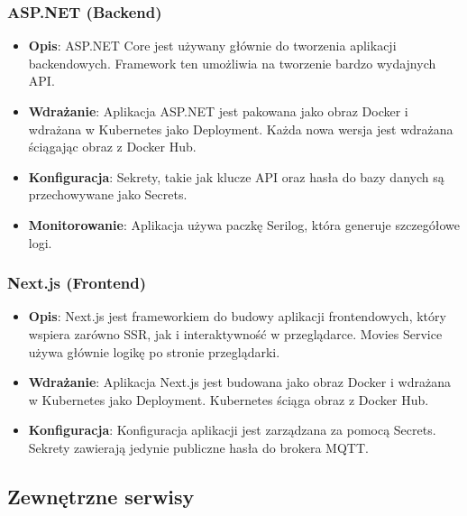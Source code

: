 \documentclass[12pt,a4paper]{article}
\begin{document}
\subsubsection{ASP.NET (Backend)}
\begin{itemize}
    \item \textbf{Opis}: ASP.NET Core jest używany głównie do tworzenia aplikacji backendowych. Framework ten umożliwia na tworzenie bardzo wydajnych API.
    \item \textbf{Wdrażanie}: Aplikacja ASP.NET jest pakowana jako obraz Docker i wdrażana w Kubernetes jako Deployment. Każda nowa wersja jest wdrażana ściągając obraz z Docker Hub.
    \item \textbf{Konfiguracja}: Sekrety, takie jak klucze API oraz hasła do bazy danych są przechowywane jako Secrets.
    \item \textbf{Monitorowanie}: Aplikacja używa paczkę Serilog, która generuje szczegółowe logi.
\end{itemize}

\newpage

\subsubsection{Next.js (Frontend)}
\begin{itemize}
    \item \textbf{Opis}: Next.js jest frameworkiem do budowy aplikacji frontendowych, który wspiera zarówno SSR, jak i interaktywność w przeglądarce. Movies Service używa głównie logikę po stronie przeglądarki.
    \item \textbf{Wdrażanie}: Aplikacja Next.js jest budowana jako obraz Docker i wdrażana w Kubernetes jako Deployment. Kubernetes ściąga obraz z Docker Hub.
    \item \textbf{Konfiguracja}: Konfiguracja aplikacji jest zarządzana za pomocą Secrets. Sekrety zawierają jedynie publiczne hasła do brokera MQTT.
\end{itemize}

\subsection{Zewnętrzne serwisy}
\end{document}
